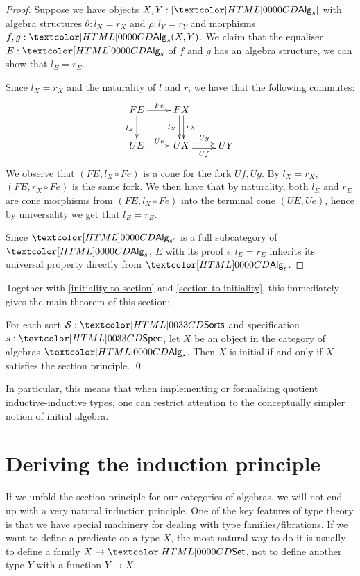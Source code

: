 \begin{proof}
  Suppose we have objects $X, Y : | \Alg_s |$ with algebra structures
  $\theta : l_X = r_X$ and $\rho : l_Y = r_Y$ and morphisms
  $f, g : \Alg_s(X,Y)$. We claim that the equaliser $E : \Alg_s$ of
  $f$ and $g$ has an algebra structure, \ie we can show that
  $l_E = r_E$.

  Since $l_X = r_X$ and the naturality of $l$ and $r$, we have that
  the following commutes:
  $$
  \xymatrix{
    FE \ar[r]^{Fe} \ar[d]_{l_E} &FX \ar@<-.5ex>[d]_-{l_X} \ar@<.5ex>[d]^-{r_X} \\
    UE \ar[r]^{Ue} &UX \ar@<-.5ex>[r]_-{Uf} \ar@<.5ex>[r]^-{Ug} &UY
  }
  $$
  We observe that $(FE, l_X \circ Fe)$ is a cone for the fork
  $Uf,Ug$. By $l_X = r_X$, $(FE, r_X \circ Fe)$ is the same fork. We
  then have that by naturality, both $l_E$ and $r_E$ are cone
  morphisms from $(FE, l_X \circ Fe)$ into the terminal cone
  $(UE,Ue)$, hence by universality we get that $l_E = r_E$.

  Since $\Alg_{s'}$ is a full subcategory of $\Alg_s$, $E$ with its
  proof $\epsilon : l_E = r_E$ inherits its universal property
  directly from $\Alg_s$.
\end{proof}

Together with \cref{initiality-to-section} and
\cref{section-to-initiality}, this immediately gives the main theorem
of this section:

\begin{theorem}
\label{thm:main}
  For each sort $\Ss : \sortsty$ and specification $s : \specty$, let $X$
  be an object in the category of algebras $\Alg_s$. Then $X$ is
  initial if and only if $X$ satisfies the section principle. \qed
\end{theorem}

In particular, this means that when implementing or formalising
quotient inductive-inductive types, one can restrict attention to the
conceptually simpler notion of initial algebra.

\section{Deriving the induction principle}

If we unfold the section principle for our categories of algebras, we
will not end up with a very natural induction principle. One of the
key features of type theory is that we have special machinery for
dealing with type families/fibrations. If we want to define a
predicate on a type $X$, the most natural way to do it is usually to
define a family $X \to \Set$, not to define another type $Y$ with a
function $Y \to X$.

